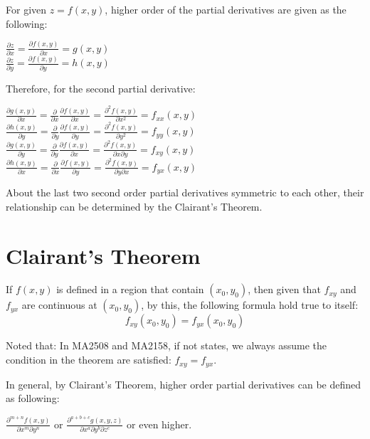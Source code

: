 For given $z=f(x,y)$, higher order of the partial derivatives are given as the following:

\begin{center}
$\frac{\partial z}{\partial x}=\frac{\partial f(x,y)}{\partial x}=g(x,y)$\\
$\frac{\partial z}{\partial y}=\frac{\partial f(x,y)}{\partial y}=h(x,y)$
\end{center}

Therefore, for the second partial derivative:

\begin{center}
$\frac{\partial g(x,y)}{\partial x}=\frac{\partial}{\partial x}\frac{\partial f(x,y)}{\partial x}=\frac{\partial^2 f(x,y)}{\partial x^2}=f_{xx}(x,y)$\\
$\frac{\partial h(x,y)}{\partial y}=\frac{\partial}{\partial y}\frac{\partial f(x,y)}{\partial y}=\frac{\partial^2 f(x,y)}{\partial y^2}=f_{yy}(x,y)$\\
$\frac{\partial g(x,y)}{\partial y}=\frac{\partial}{\partial y}\frac{\partial f(x,y)}{\partial x}=\frac{\partial^2 f(x,y)}{\partial x\partial y}=f_{xy}(x,y)$\\
$\frac{\partial h(x,y)}{\partial x}=\frac{\partial}{\partial x}\frac{\partial f(x,y)}{\partial y}=\frac{\partial^2 f(x,y)}{\partial y\partial x}=f_{yx}(x,y)$
\end{center}

About the last two second order partial derivatives symmetric to each other, their relationship can be determined by the Clairant's Theorem.

\section{Clairant's Theorem}
If $f(x,y)$ is defined in a region that contain $(x_0,y_0)$, then given that $f_{xy}$ and $f_{yx}$ are continuous at $(x_0,y_0)$, by this, the following formula hold true to itself:
\begin{equation}
\boxed{f_{xy}(x_0,y_0)=f_{yx}(x_0,y_0)}
\end{equation}

Noted that: In MA2508 and MA2158, if not states, we always assume the condition in the theorem are satisfied: $f_{xy}=f_{yx}$.

In general, by Clairant's Theorem, higher order partial derivatives can be defined as following:
\begin{center}
$\frac{\partial^{m+n}f(x,y)}{\partial x^m \partial y^n}$ or $\frac{\partial^{a+b+c}g(x,y,z)}{\partial x^a \partial y^b \partial z^c}$ or even higher.
\end{center}

